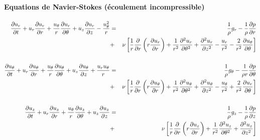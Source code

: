 %
%
%
%
%





\paragraph{Equations de Navier-Stokes (écoulement incompressible)}

\begin{eqnarray*}
\dpa{u_r}{t} + u_r \dpa{u_r}{r} + \frac{u_{\theta}}{r} \dpa{u_r}{\theta} + u_z \dpa{u_r}{z} - \frac{u_{\theta}^2}{r} & = &
\frac{1}{\rho} g_r - \frac{1}{\rho} \dpa{p}{r} \\
& + & \nu \left[ \frac{1}{r} \dpa{}{r} \left( r \dpa{u_r}{r} \right) + 
             \frac{1}{r^2} \ddpa{u_r}{\theta} + \ddpa{u_r}{z} -
             \frac{u_r}{r^2} - \frac{2}{r^2} \dpa{u_{\theta}}{\theta} \right] \\
\\
\dpa{u_{\theta}}{t} + u_r \dpa{u_{\theta}}{r} + \frac{u_{\theta}}{r} \dpa{u_{\theta}}{\theta} + u_z \dpa{u_{\theta}}{z} + \frac{u_r u_{\theta}}{r} & = &
\frac{1}{\rho} g_{\theta} - \frac{1}{\rho r} \dpa{p}{\theta} \\
& + & \nu \left[ \frac{1}{r} \dpa{}{r} \left( r \dpa{u_{\theta}}{r} \right) + 
             \frac{1}{r^2} \ddpa{u_{\theta}}{\theta} + \ddpa{u_{\theta}}{z} -
             \frac{u_{\theta}}{r^2} + \frac{2}{r^2} \dpa{u_r}{\theta} \right] \\
\\
\dpa{u_z}{t} + u_r \dpa{u_z}{r} + \frac{u_{\theta}}{r} \dpa{u_z}{\theta} + u_z \dpa{u_z}{z} & = &
\frac{1}{\rho} g_z - \frac{1}{\rho} \dpa{p}{z} \\
& + & \nu \left[ \frac{1}{r} \dpa{}{r} \left( r \dpa{u_z}{r} \right) + 
             \frac{1}{r^2} \ddpa{u_z}{\theta} + \ddpa{u_z}{z} \right]
\end{eqnarray*}


